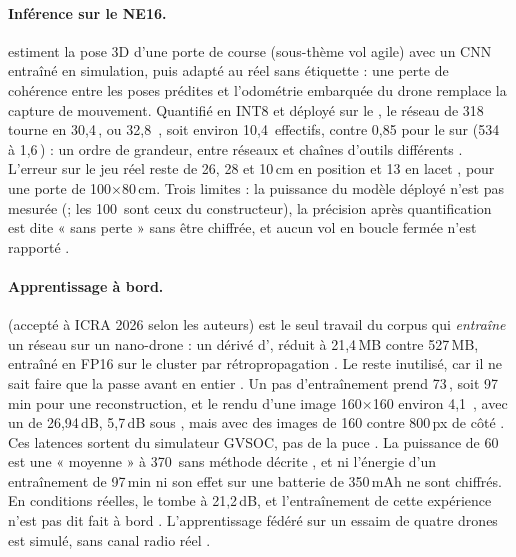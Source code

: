 \paragraph{Inférence sur le NE16.}
\citet{arxiv-2603.02936-self-supervised-domain-adaptation-visual}\pp{} estiment la pose
3D d'une porte de course (sous-thème vol agile) avec un CNN entraîné en simulation, puis
adapté au réel sans étiquette : une perte de cohérence entre les poses prédites et
l'odométrie embarquée du drone remplace la capture de mouvement. Quantifié en INT8 et
déployé sur le , le réseau de 318\, tourne en 30,4\,, ou 32,8\, ,
soit environ 10,4\, effectifs, contre 0,85 pour le  sur 
(534\, à 1,6\,) : un ordre de grandeur, entre réseaux et chaînes d'outils
différents \deduit.
L'erreur sur le jeu réel reste de 26, 28 et 10\,cm en position et 13\textdegree{} en lacet
\med, pour une porte de 100$\times$80\,cm. Trois limites : la puissance du
modèle déployé n'est pas mesurée (\nr ; les 100\, sont ceux du constructeur), la
précision après quantification est dite « sans perte » sans être chiffrée, et aucun vol en
boucle fermée n'est rapporté .

\paragraph{Apprentissage à bord.} 
\citep{arxiv-2603.01850-tiny-dronerf-tiny-neural-radiance}\pp{} (accepté à ICRA 2026
selon les auteurs) est le seul travail du corpus qui \emph{entraîne} un réseau sur un
nano-drone : un  dérivé d', réduit à 21,4\,MB contre 527\,MB, entraîné en
FP16 sur le cluster par rétropropagation . Le  reste inutilisé, car il
ne sait faire que la passe avant en entier . Un pas d'entraînement prend
73\,, soit 97\,min pour une reconstruction, et le rendu d'une image 160$\times$160 environ
4,1\, , avec un  de 26,94\,dB, 5,7\,dB sous , mais avec des
images de 160 contre 800\,px de côté \med. Ces latences sortent du simulateur
GVSOC, pas de la puce . La puissance de 60\, est une « moyenne » à 370\,
sans méthode décrite , et ni l'énergie d'un entraînement de 97\,min ni son
effet sur une batterie de 350\,mAh ne sont chiffrés. En conditions réelles, le  tombe
à 21,2\,dB, et l'entraînement de cette expérience n'est pas dit fait à bord .
L'apprentissage fédéré sur un essaim de quatre drones est simulé, sans canal radio réel
.

